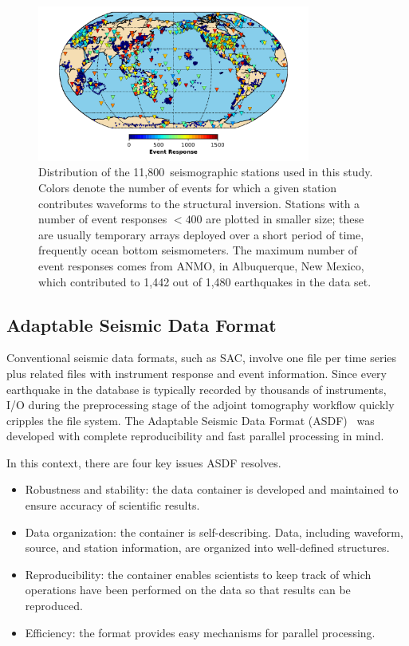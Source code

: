 \documentclass[extra,mreferee]{gji}
\begin{document}
\begin{figure}
  \includegraphics[width=0.8\textwidth]{figures/station_map.pdf}
  \caption{\small{Distribution of the 11,800~seismographic stations used in this study. Colors denote the number of events for which a given station contributes waveforms to the structural inversion. Stations with a number of event responses $<400$ are plotted in smaller size; these are usually temporary arrays deployed over a short period of time, frequently ocean bottom seismometers. The maximum number of event responses comes from ANMO, in Albuquerque, New Mexico, which contributed to 1,442 out of 1,480 earthquakes in the data set.}}
  \label{fig:stations}
  \centering
\end{figure}

\subsection{Adaptable Seismic Data Format}
\label{section:ASDF}

Conventional seismic data formats, such as SAC, involve one file per time series
plus related files with instrument response and event information.
Since every earthquake in the database is typically recorded by thousands of
instruments, I/O during the preprocessing stage of the adjoint tomography workflow
quickly cripples the file system. The Adaptable Seismic Data Format
(ASDF)~\citep[][ \texttt{https://seismic-data.org/ }]{krischer2016adaptable}
was developed with complete reproducibility and fast parallel processing in mind.

In this context, there are four key issues ASDF resolves.
\begin{itemize}
    \item Robustness and stability: the data container is developed and maintained to ensure accuracy of scientific results.
    \item Data organization: the container is self-describing. Data, including waveform, source, and station information, are organized into well-defined structures.
    \item Reproducibility: the container enables scientists to keep track of which operations have been performed on the data so that results can be reproduced.
    \item Efficiency: the format provides easy mechanisms for parallel processing.
\end{itemize}
\end{document}
